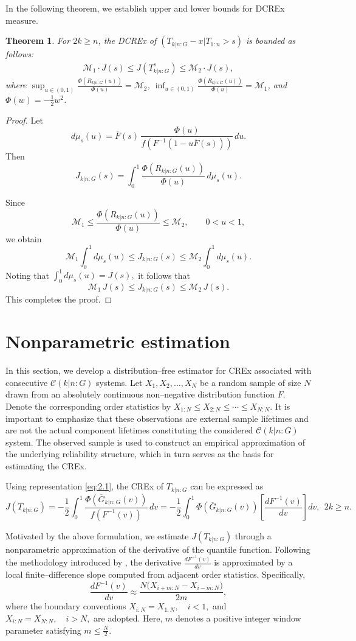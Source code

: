 \documentclass[12pt,a4paper]{article}
\numberwithin{equation}{section}
\newtheorem{theorem}{Theorem}[section]
\begin{document}
In the following theorem, we establish upper and lower bounds for DCREx measure.
\begin{theorem}
For $2k\geq n$, the DCREx of $(T_{k|n:G}-x|T_{1:n}>s)$ is bounded as follows:
\begin{align*}
    \mathcal M_1\cdot J(s)\leq J(T^s_{k|n:G})\leq \mathcal M_2\cdot J(s),
\end{align*}
where $\sup_{u\in(0,1)}\frac{\Phi(R_{k|n:G}(u))
}{\Phi(u)}=\mathcal M_2$,  $\inf_{u\in(0,1)}\frac{\Phi(R_{k|n:G}(u))
}{\Phi(u)}=\mathcal M_1$, and $\Phi(w)=-\frac{1}{2}w^2$.
\end{theorem}
\begin{proof}
Let
\[
d\mu_s(u)
=
\bar F(s)\,
\frac{\Phi(u)}
     {f(F^{-1}(1-u\bar F(s)))}
\,du.
\]
Then
\[
J_{k|n:G}(s)
=
\int_0^1
\frac{\Phi(R_{k|n:G}(u))}
     {\Phi(u)}
\,d\mu_s(u).
\]

Since
\[
\mathcal M_1
\le
\frac{\Phi(R_{k|n:G}(u))}
     {\Phi(u)}
\le
\mathcal M_2,
\qquad 0<u<1,
\]
we obtain
\[
\mathcal M_1
\int_0^1 d\mu_s(u)
\le
J_{k|n:G}(s)
\le
\mathcal M_2
\int_0^1 d\mu_s(u).
\]
Noting that $\int_0^1 d\mu_s(u)
=
J(s),$
it follows that
\[
\mathcal M_1\,J(s)
\le
J_{k|n:G}(s)
\le
\mathcal M_2\,J(s).
\]
This completes the proof.
\end{proof}
\section{Nonparametric estimation}
In this section, we develop a distribution--free estimator for CREx associated with consecutive $\mathcal{C}(k|n:G)$ systems. Let $X_1,X_2,\ldots,X_N$
be a random sample of size $N$ drawn from an absolutely continuous non--negative distribution function $F$. Denote the corresponding order statistics by $X_{1:N}\leq X_{2:N}\leq \cdots \leq X_{N:N}.$
It is important to emphasize that these observations are external sample lifetimes and are not the actual component lifetimes constituting the considered  $\mathcal{C}(k|n:G)$ system. The observed sample is used to construct an empirical approximation of the underlying reliability structure, which in turn serves as the basis for estimating the CREx.

Using representation \eqref{eq:2.1}, the CREx of $T_{k|n:G}$ can be expressed as
$$
J(T_{k|n:G})
=-\frac12
\int_0^1
\frac{\Phi\!\left(\overline G_{k|n:G}(v)\right)}
{f(F^{-1}(v))}
\,dv
=-\frac12
\int_0^1
\Phi\!\left(\overline G_{k|n:G}(v)\right)
\left[\frac{dF^{-1}(v)}{dv}\right]
dv,~~2k\geq n.
$$

Motivated by the above formulation, we estimate
$J(T_{k|n:G})$
through a nonparametric approximation of the derivative of the quantile function. Following the methodology introduced by \cite{vas1976}, the derivative $\frac{dF^{-1}(v)}{dv}$
is approximated by a local finite--difference slope computed from adjacent order statistics. Specifically,
$$
\frac{dF^{-1}(v)}{dv}
\approx
\frac{N\bigl(X_{i+m:N}-X_{i-m:N}\bigr)}{2m},
$$
where the boundary conventions
$X_{i:N}=X_{1:N}, \quad i<1,$
and $X_{i:N}=X_{N:N}, \quad i>N,$
are adopted. Here, $m$ denotes a positive integer window parameter satisfying $m\leq \frac{N}{2}.$
\end{document}
